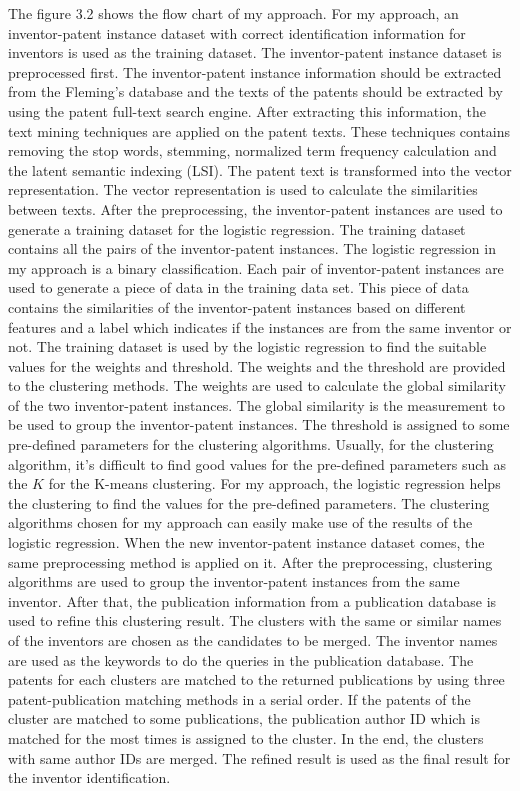The figure 3.2 shows the flow chart of my approach. For my approach, an inventor-patent instance dataset with correct identification information for inventors is used as the training dataset. The inventor-patent instance dataset is preprocessed first. The inventor-patent instance information should be extracted from the Fleming's database and the texts of the patents should be extracted by using the patent full-text search engine. After extracting this information, the text mining techniques are applied on the patent texts. These techniques contains removing the stop words, stemming, normalized term frequency calculation and the latent semantic indexing (LSI). The patent text is transformed into the vector representation. The vector representation is used to calculate the similarities between texts. After the preprocessing, the inventor-patent instances are used to generate a training dataset for the logistic regression. The training dataset contains all the pairs of the inventor-patent instances. The logistic regression in my approach is a binary classification. Each pair of inventor-patent instances are used to generate a piece of data in the training data set. This piece of data contains the similarities of the inventor-patent instances based on different features and a label which indicates if the instances are from the same inventor or not. The training dataset is used by the logistic regression to find the suitable values for the weights and threshold. The weights and the threshold are provided to the clustering methods. The weights are used to calculate the global similarity of the two inventor-patent instances.  The global similarity is the measurement to be used to group the inventor-patent instances. The threshold is assigned to some pre-defined parameters  for the clustering algorithms. Usually, for the clustering algorithm, it's difficult to find good values for the pre-defined parameters such as the $K$ for the K-means clustering. For my approach, the logistic regression helps the clustering to find the values for the pre-defined parameters. The clustering algorithms chosen for my approach can easily make use of the results of the logistic regression. When the new inventor-patent instance dataset comes, the same preprocessing method is  applied on it. After the preprocessing,  clustering algorithms are used to group the inventor-patent instances from the same inventor. After that, the publication information from a publication database is used to refine this clustering result. The clusters with the same or similar names of the inventors are chosen as the candidates to be merged. The inventor names are used as the keywords to do the queries in the publication database. The patents for each clusters are matched to the returned publications  by using  three patent-publication matching methods in a serial order. If the patents of the cluster are matched to some  publications, the publication author ID which is matched for the most times is assigned to the cluster. In the end, the clusters with same author IDs are merged. The refined result is used as the final result for the inventor identification.

\newpage
\thispagestyle{empty}
\rule{0cm}{5cm}